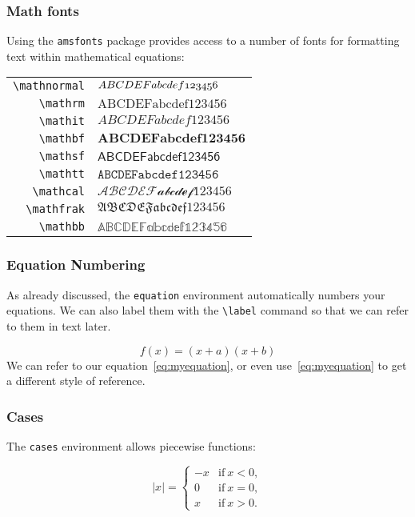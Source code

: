 \documentclass[mathserif]{beamer}
\begin{document}
\begin{frame}[fragile]
\frametitle{Math fonts}
\vfill
Using the \texttt{amsfonts} package provides access to a number of fonts for formatting text within mathematical equations:
\vfill
\begin{center}
\begin{tabular}{r | l | }
	\texttt{{\textbackslash}mathnormal} & $\mathnormal{ABCDEFabcdef123456}$ \\
	\texttt{{\textbackslash}mathrm} & $\mathrm{ABCDEFabcdef123456}$ \\
	\texttt{{\textbackslash}mathit} & $\mathit{ABCDEFabcdef123456}$ \\
	\texttt{{\textbackslash}mathbf} & $\mathbf{ABCDEFabcdef123456}$ \\
	\texttt{{\textbackslash}mathsf} & $\mathsf{ABCDEFabcdef123456}$ \\
	\texttt{{\textbackslash}mathtt} & $\mathtt{ABCDEFabcdef123456}$ \\
	\texttt{{\textbackslash}mathcal} & $\mathcal{ABCDEFabcdef123456}$ \\
	\texttt{{\textbackslash}mathfrak} & $\mathfrak{ABCDEFabcdef123456}$ \\
	\texttt{{\textbackslash}mathbb} & $\mathbb{ABCDEFabcdef123456}$ \\		
\end{tabular}
\end{center}
\vfill
\end{frame}

\begin{frame}[fragile]
\frametitle{Equation Numbering}
\vfill
As already discussed, the \texttt{equation} environment automatically numbers your equations. We can also label them with the \texttt{{\textbackslash}label} command so that we can refer to them in text later.
\vfill
	\begin{LTXexample}[style=latexsty]
		\begin{equation}
		\label{eq:myequation}
		    f(x) = (x+a)(x+b)
		\end{equation}
		We can refer to our equation~\ref{eq:myequation}, or even use~\eqref{eq:myequation} to get a different style of reference.
	\end{LTXexample}
\vfill
\end{frame}

\begin{frame}[fragile]
\frametitle{Cases}
\vfill
The \texttt{cases} environment allows piecewise functions:
\vfill
	\begin{LTXexample}[style=latexsty]
		\begin{equation}
		    |x| = 
		    \begin{cases}
		        -x & \text{if}\ x < 0, \\
		        0 & \text{if}\ x = 0, \\
		        x & \text{if}\ x > 0.
		    \end{cases}
		\end{equation}
	\end{LTXexample}
\vfill
\end{frame}
\end{document}
